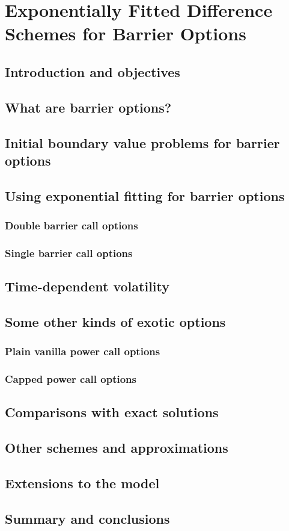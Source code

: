 \chapter{Exponentially Fitted Difference Schemes for Barrier Options}

\section{Introduction and objectives}

\section{What are barrier options?}

\section{Initial boundary value problems for barrier options}

\section{Using exponential fitting for barrier options}

\subsection{Double barrier call options}

\subsection{Single barrier call options}

\section{Time-dependent volatility}

\section{Some other kinds of exotic options}

\subsection{Plain vanilla power call options}

\subsection{Capped power call options}

\section{Comparisons with exact solutions}

\section{Other schemes and approximations}

\section{Extensions to the model}

\section{Summary and conclusions}